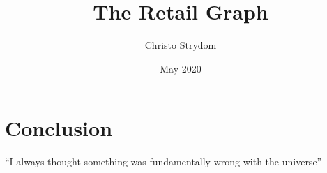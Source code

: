 \documentclass{article}
\title{The Retail Graph}
\author{Christo Strydom}
\date{May 2020}
\begin{document}
\maketitle



\section{Conclusion}
``I always thought something was fundamentally wrong with the universe'' \citep{adams1995hitchhiker}



\end{document}
